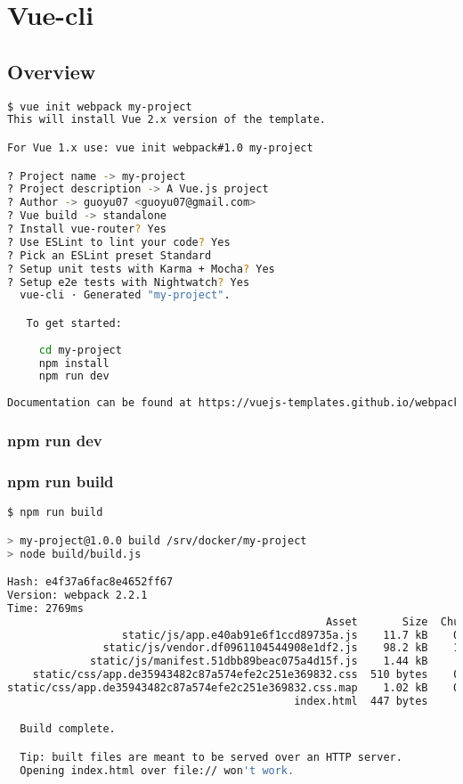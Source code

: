 \part{Vue-cli}

\chapter{Overview}


\begin{lstlisting}[language=bash]
$ vue init webpack my-project
This will install Vue 2.x version of the template.

For Vue 1.x use: vue init webpack#1.0 my-project

? Project name -> my-project
? Project description -> A Vue.js project
? Author -> guoyu07 <guoyu07@gmail.com>
? Vue build -> standalone
? Install vue-router? Yes
? Use ESLint to lint your code? Yes
? Pick an ESLint preset Standard
? Setup unit tests with Karma + Mocha? Yes
? Setup e2e tests with Nightwatch? Yes
  vue-cli · Generated "my-project".

   To get started:
   
     cd my-project
     npm install
     npm run dev
   
Documentation can be found at https://vuejs-templates.github.io/webpack
\end{lstlisting}

\section{npm run dev}



\section{npm run build}


\begin{lstlisting}[language=bash]
$ npm run build

> my-project@1.0.0 build /srv/docker/my-project
> node build/build.js

Hash: e4f37a6fac8e4652ff67
Version: webpack 2.2.1
Time: 2769ms
                                                  Asset       Size  Chunks             Chunk Names
                  static/js/app.e40ab91e6f1ccd89735a.js    11.7 kB    0, 2  [emitted]  app
               static/js/vendor.df0961104544908e1df2.js    98.2 kB    1, 2  [emitted]  vendor
             static/js/manifest.51dbb89beac075a4d15f.js    1.44 kB       2  [emitted]  manifest
    static/css/app.de35943482c87a574efe2c251e369832.css  510 bytes    0, 2  [emitted]  app
static/css/app.de35943482c87a574efe2c251e369832.css.map    1.02 kB    0, 2  [emitted]  app
                                             index.html  447 bytes          [emitted]  

  Build complete.

  Tip: built files are meant to be served over an HTTP server.
  Opening index.html over file:// won't work.
\end{lstlisting}

